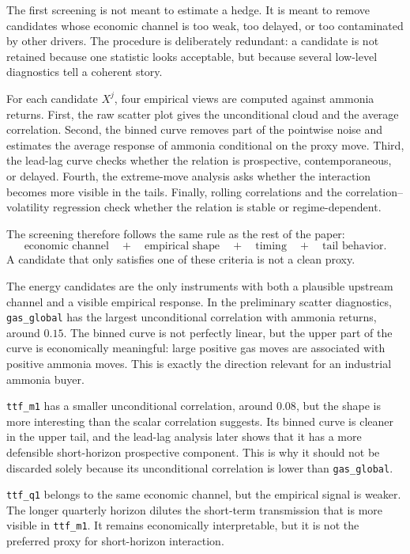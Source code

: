 \documentclass[11pt]{article}
\newcommand{\1}{\mathbf 1}
\begin{document}
The first screening is not meant to estimate a hedge. It is meant to remove candidates whose economic channel is too weak, too delayed, or too contaminated by other drivers. The procedure is deliberately redundant: a candidate is not retained because one statistic looks acceptable, but because several low-level diagnostics tell a coherent story.

For each candidate \(X^j\), four empirical views are computed against ammonia returns. First, the raw scatter plot gives the unconditional cloud and the average correlation. Second, the binned curve removes part of the pointwise noise and estimates the average response of ammonia conditional on the proxy move. Third, the lead-lag curve checks whether the relation is prospective, contemporaneous, or delayed. Fourth, the extreme-move analysis asks whether the interaction becomes more visible in the tails. Finally, rolling correlations and the correlation--volatility regression check whether the relation is stable or regime-dependent.

The screening therefore follows the same rule as the rest of the paper:
\[
\text{economic channel}
\quad+\quad
\text{empirical shape}
\quad+\quad
\text{timing}
\quad+\quad
\text{tail behavior}.
\]
A candidate that only satisfies one of these criteria is not a clean proxy.

The energy candidates are the only instruments with both a plausible upstream channel and a visible empirical response. In the preliminary scatter diagnostics, \texttt{gas\_global} has the largest unconditional correlation with ammonia returns, around \(0.15\). The binned curve is not perfectly linear, but the upper part of the curve is economically meaningful: large positive gas moves are associated with positive ammonia moves. This is exactly the direction relevant for an industrial ammonia buyer.

\texttt{ttf\_m1} has a smaller unconditional correlation, around \(0.08\), but the shape is more interesting than the scalar correlation suggests. Its binned curve is cleaner in the upper tail, and the lead-lag analysis later shows that it has a more defensible short-horizon prospective component. This is why it should not be discarded solely because its unconditional correlation is lower than \texttt{gas\_global}.

\texttt{ttf\_q1} belongs to the same economic channel, but the empirical signal is weaker. The longer quarterly horizon dilutes the short-term transmission that is more visible in \texttt{ttf\_m1}. It remains economically interpretable, but it is not the preferred proxy for short-horizon interaction.
\end{document}
